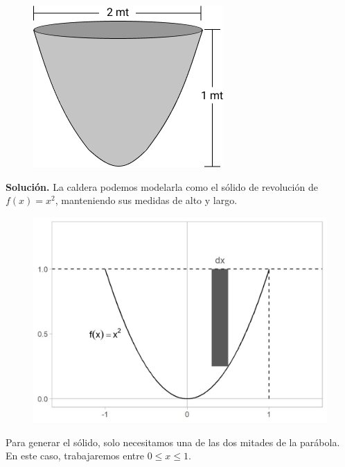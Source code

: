 \documentclass[12pt]{article}
\begin{document}
\newpage

\begin{figure}[hbt!]
\centering
\includegraphics[scale=0.5]{img/cauldron-example-1.jpg}
\end{figure}

\textbf{Solución.} \quad La caldera podemos modelarla como el sólido de revolución de $f(x) = x^{2}$, manteniendo sus medidas de alto y largo.

\begin{figure}[hbt!]
\centering
\includegraphics[scale=0.7]{img/cauldron-example-2.jpg}
\end{figure}

Para generar el sólido, solo necesitamos una de las dos mitades de la parábola. En este caso, trabajaremos entre $0 \leq x \leq 1$.
\end{document}

